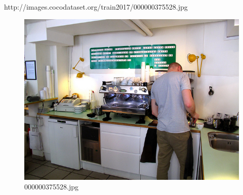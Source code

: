 http://images.cocodataset.org/train2017/000000375528.jpg
\begin{figure}[h]
    \centering
    \includegraphics[width=0.8\linewidth]{../image set/hard/000000375528.jpg}
    \caption{000000375528.jpg}
\end{figure}
